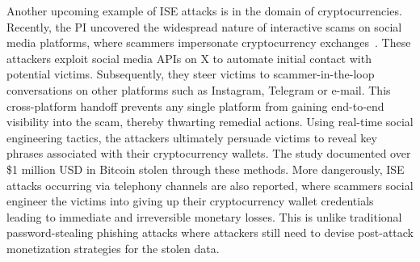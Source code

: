 



 Another upcoming example of ISE attacks is in the domain of cryptocurrencies. Recently, the PI uncovered the widespread nature of interactive scams on social media platforms, where scammers impersonate cryptocurrency exchanges~\cite{honeytweets}. These attackers exploit social media APIs on X to automate initial contact with potential victims. Subsequently, they steer victims to scammer-in-the-loop conversations on other platforms such as Instagram, Telegram or e-mail. This cross-platform handoff prevents any single platform from gaining end-to-end visibility into the scam, thereby thwarting remedial actions. Using real-time social engineering tactics, the attackers ultimately persuade victims to reveal key phrases associated with their cryptocurrency wallets. The study documented over \$1 million USD in Bitcoin stolen through these methods.
More dangerously, ISE attacks occurring via telephony channels are also reported, where scammers social engineer the victims into giving up their cryptocurrency wallet credentials~\cite{coinbase_psa,ic3_crypto_psa} leading to immediate and irreversible monetary losses. This is unlike traditional password-stealing phishing attacks where attackers still need to devise post-attack monetization strategies for the stolen data. 
